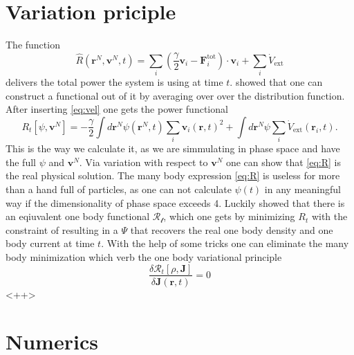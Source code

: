 \documentclass[a4paper]{article}
\renewcommand\vec[1]{\mathbf{#1}}
\begin{document}
\section{Variation priciple}
The function 
\begin{equation}
	\hat{R}\left( \vec{r}^N,\vec{v}^N,t \right) = \sum_{i} \left( \frac{ \gamma}{2} \vec{v}_i - \vec{F}_i^{\mathrm{tot}} \right) \cdot \vec{v}_i + \sum_{i} \dot{V}_{\mathrm{ext}} 
	\label{eq:Rhat}
\end{equation}
delivers the total power the system is using at time $t$. %
\cite{MS100} showed that one can construct a functional out of it by averaging over over the distribution function. %
After inserting \cref{eq:vel} one gets the power functional
\begin{equation}
	R_t\left[ \psi,\vec{v}^N \right]=- \frac{ \gamma}{2} \int{} d \vec{r}^N \psi\left( \vec{r}^N,t \right) \sum_i \vec{v}_i\left( \vec{r},t \right)^2 + \int{} d \vec{r}^N \psi \sum_i \dot{V}_{\mathrm{ext}}\left( \vec{r}_i,t \right).
	\label{eq:R}
\end{equation}
This is the way we calculate it, as we are simmulating in phase space and have the full $\psi$ and $\vec{v}^N$. Via variation with respect to $\vec{v}^N$ one can show that \cref{eq:R} is the real physical solution. 
The many body expression \cref{eq:R} is useless for more than a hand full of particles, as one can not calculate $\psi(t)$ in any meaningful way if the dimensionality of phase space exceeds 4. Luckily \cite{MS100} showed that %
there is an eqiuvalent one body functional $\mathcal{R_t}$, which one gets by minimizing $R_t$ with the constraint of resulting in a $\Psi$ that recovers the real one body density and one body current at time $t$. With the help of some tricks one can eliminate the many body minimization which verb the one body variational principle
\begin{equation}
	\frac{\delta \mathcal{R}_t\left[ \rho,\vec{J} \right]}{\delta \vec{J}(\vec{r},t)} = 0
	\label{<+label+>}
\end{equation}<++>

\section{Numerics}
\end{document}
